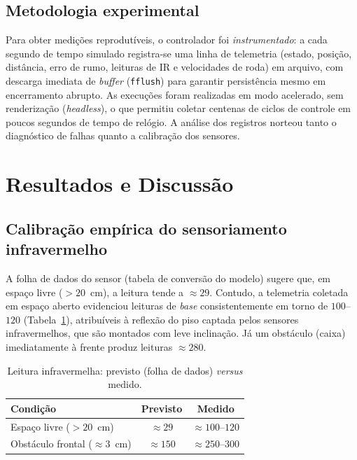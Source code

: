 \documentclass[11pt,a4paper]{article}
\begin{document}
\subsection{Metodologia experimental}
Para obter medições reprodutíveis, o controlador foi \emph{instrumentado}: a cada segundo de tempo simulado registra-se uma linha de telemetria (estado, posição, distância, erro de rumo, leituras de IR e velocidades de roda) em arquivo, com descarga imediata de \emph{buffer} (\texttt{fflush}) para garantir persistência mesmo em encerramento abrupto. As execuções foram realizadas em modo acelerado, sem renderização (\emph{headless}), o que permitiu coletar centenas de ciclos de controle em poucos segundos de tempo de relógio. A análise dos registros norteou tanto o diagnóstico de falhas quanto a calibração dos sensores.

\section{Resultados e Discussão}
\label{sec:resultados}

\subsection{Calibração empírica do sensoriamento infravermelho}
\label{sec:calib}
A folha de dados do sensor (tabela de conversão do modelo) sugere que, em espaço livre ($>20$~cm), a leitura tende a $\approx 29$. Contudo, a telemetria coletada em espaço aberto evidenciou leituras de \emph{base} consistentemente em torno de $100$--$120$ (Tabela~\ref{tab:calib}), atribuíveis à reflexão do piso captada pelos sensores infravermelhos, que são montados com leve inclinação. Já um obstáculo (caixa) imediatamente à frente produz leituras $\approx 280$.

\begin{table}[H]
\centering
\caption{Leitura infravermelha: previsto (folha de dados) \emph{versus} medido.}
\label{tab:calib}
\begin{tabular}{@{}lcc@{}}
\toprule
\textbf{Condição} & \textbf{Previsto} & \textbf{Medido} \\
\midrule
Espaço livre ($>20$~cm) & $\approx 29$ & $\approx 100$--$120$ \\
Obstáculo frontal ($\approx 3$~cm) & $\approx 150$ & $\approx 250$--$300$ \\
\bottomrule
\end{tabular}
\end{table}
\end{document}
